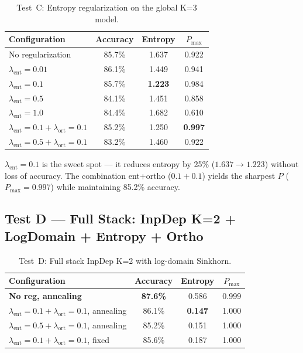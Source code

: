 \documentclass[11pt,a4paper]{report}
\begin{document}
\begin{table}[h]
\centering
\caption{Test~C: Entropy regularization on the global K=3 model.}
\begin{tabular}{lccc}
\hline
\textbf{Configuration} & \textbf{Accuracy} & \textbf{Entropy} & $P_{\max}$ \\
\hline
No regularization & 85.7\% & 1.637 & 0.922 \\
$\lambda_{\text{ent}} = 0.01$ & 86.1\% & 1.449 & 0.941 \\
$\lambda_{\text{ent}} = 0.1$ & 85.7\% & \textbf{1.223} & 0.984 \\
$\lambda_{\text{ent}} = 0.5$ & 84.1\% & 1.451 & 0.858 \\
$\lambda_{\text{ent}} = 1.0$ & 84.4\% & 1.682 & 0.610 \\
$\lambda_{\text{ent}}=0.1 + \lambda_{\text{ort}}=0.1$ & 85.2\% & 1.250 & \textbf{0.997} \\
$\lambda_{\text{ent}}=0.5 + \lambda_{\text{ort}}=0.1$ & 83.2\% & 1.460 & 0.922 \\
\hline
\end{tabular}
\end{table}

$\lambda_{\text{ent}}=0.1$ is the sweet spot --- it reduces entropy by 25\% ($1.637 \to 1.223$) without loss of accuracy. The combination ent+ortho ($0.1+0.1$) yields the sharpest $P$ ($P_{\max}=0.997$) while maintaining 85.2\% accuracy.


\subsection{Test D --- Full Stack: InpDep K=2 + LogDomain + Entropy + Ortho}

\begin{table}[h]
\centering
\caption{Test~D: Full stack InpDep K=2 with log-domain Sinkhorn.}
\begin{tabular}{lccc}
\hline
\textbf{Configuration} & \textbf{Accuracy} & \textbf{Entropy} & $P_{\max}$ \\
\hline
\textbf{No reg, annealing} & \textbf{87.6\%} & 0.586 & 0.999 \\
$\lambda_{\text{ent}}=0.1 + \lambda_{\text{ort}}=0.1$, annealing & 86.1\% & \textbf{0.147} & 1.000 \\
$\lambda_{\text{ent}}=0.5 + \lambda_{\text{ort}}=0.1$, annealing & 85.2\% & 0.151 & 1.000 \\
$\lambda_{\text{ent}}=0.1 + \lambda_{\text{ort}}=0.1$, fixed & 85.6\% & 0.187 & 1.000 \\
\hline
\end{tabular}
\end{table}
\end{document}
